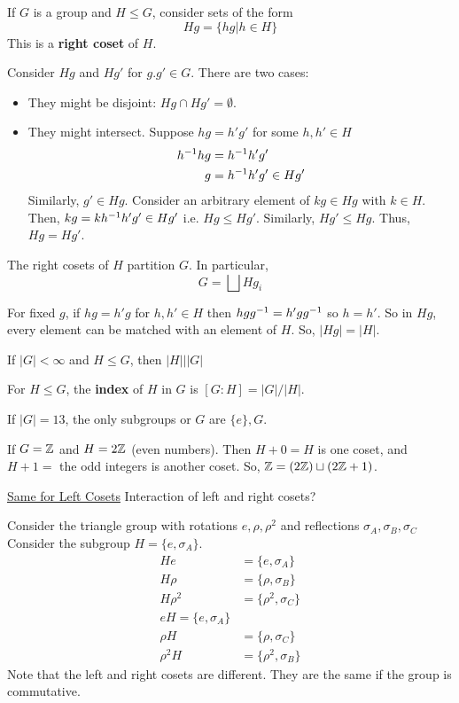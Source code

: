 \documentclass[a4paper]{article}
\begin{document}
\begin{definition}[Coset]
    If $G$ is a group and $H\leq G$, consider sets of the form
    \begin{equation}
        Hg=\{hg|h\in H\}
    \end{equation}
    This is a \textbf{right coset} of $H$.
\end{definition}
\begin{theorem}
    Consider $Hg$ and $Hg'$ for $g.g'\in G$. There are two cases:
    \begin{itemize}
        \item They might be disjoint: $Hg\cap Hg'=\emptyset$.
        \item They might intersect. Suppose $hg=h'g'$ for some $h,h'\in H$
        \begin{align}
            h^{-1} hg&=h^{-1} h'g'\\
            g&=h^{-1} h'g'\in Hg'
        \end{align}
        Similarly, $g'\in Hg$. Consider an arbitrary element of $kg\in Hg$ with $k\in H$. Then, $kg=kh^{-1} h'g'\in Hg'$ i.e. $Hg\leq Hg'$. Similarly, $Hg'\leq Hg$. Thus, $Hg=Hg'$.
    \end{itemize}
    The right cosets of $H$ partition $G$. In particular,
    \begin{equation}
        G = \bigsqcup Hg_i
    \end{equation}
\end{theorem}

For fixed $g$, if $hg=h'g$ for $h,h'\in H$ then $hgg^{-1}=h'gg^{-1}$ so $h=h'$. So in $Hg$, every element can be matched with an element of $H$. So, $|Hg|=|H|$.

\begin{theorem}[Lagrange]
    If $|G|<\infty$ and $H\leq G$, then $|H|\Big\vert|G|$
\end{theorem}
\begin{definition}[Index]
    For $H\leq G$, the \textbf{index} of $H$ in $G$ is $[G:H]=|G|/|H|$.
\end{definition}
If $|G|=13$, the only subgroups or $G$ are $\{e\},G$.

If $G=\mathbb{Z}$ and $H=2\mathbb{Z}$ (even numbers). Then $H+0=H$ is one coset, and $H+1=$ the odd integers is another coset. So, $\mathbb{Z}=(2\mathbb{Z})\sqcup(2\mathbb{Z}+1)$.

\underline{Same for Left Cosets}
Interaction of left and right cosets? 

Consider the triangle group with rotations $e,\rho,\rho^2$ and reflections $\sigma_A, \sigma_B, \sigma_C$ Consider the subgroup $H=\{e,\sigma_A\}$.
\begin{align}
    He&=\{e,\sigma_A\}\\
    H\rho&=\{\rho,\sigma_B\}\\
    H\rho^2&=\{\rho^2,\sigma_C\}\\
    eH=\{e,\sigma_A\}\\
    \rho H&=\{\rho, \sigma_C\}\\
    \rho^2 H&=\{\rho^2,\sigma_B\}
\end{align}
Note that the left and right cosets are different. They are the same if the group is commutative.
\end{document}
